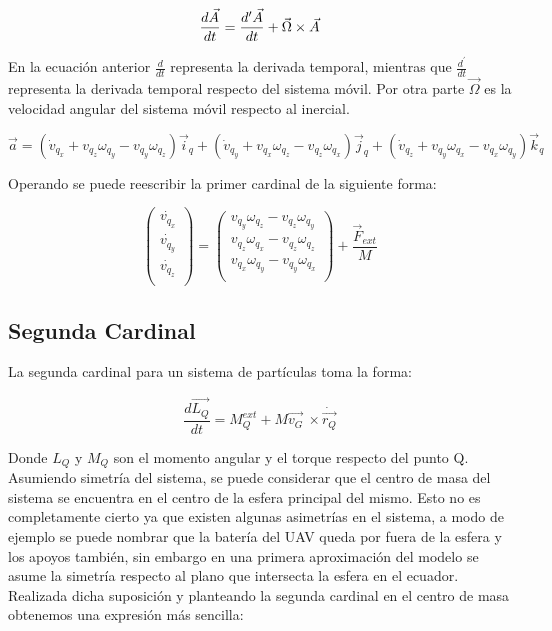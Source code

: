 \documentclass[main]{subfiles}
\begin{document}
\begin{equation}
\frac{d\vec{A}}{dt} =\frac{d^\prime\vec{A}}{dt}+\vec{\Omega}\times\vec{A} \\
\end{equation}

En la ecuaci\'on anterior $\frac{d}{dt}$ representa la derivada temporal, mientras que $\frac{d^\prime}{dt}$ representa la derivada temporal respecto del sistema m\'ovil. Por otra parte $\vec{\Omega}$ es la velocidad angular del sistema m\'ovil respecto al inercial. 

\begin{equation}
\vec{a} = (\dot{v}_{q_x}+v_{q_z} \omega_{q_y} - v_{q_y} \omega_{q_z} )\vec{i}_q + (\dot{v}_{q_y}+v_{q_x} \omega_{q_z} - v_{q_z} \omega_{q_x} )\vec{j}_q+(\dot{v}_{q_z}+v_{q_y} \omega_{q_x} - v_{q_x} \omega_{q_y} )\vec{k}_q
\end{equation}


Operando se puede reescribir la primer cardinal de la siguiente forma:

\begin{equation}
\left(\begin{array}{c}\dot{v_{q_x}}\\
\dot{v_{q_y}}\\
\dot{v_{q_z}}\\
\end{array} \right) = \left(\begin{array}{c}
v_{q_y} \omega_{q_z} - v_{q_z} \omega_{q_y}	\\
v_{q_z} \omega_{q_x} - v_{q_z} \omega_{q_z}\\
v_{q_x} \omega_{q_y} - v_{q_y} \omega_{q_x}\\
\end{array}\right) + \frac{\vec{F}_{ext} }{M}
\label{vpuntos}
\end{equation}


\subsection{Segunda Cardinal}

La segunda cardinal para un sistema de part\'iculas toma la forma:

\begin{equation}
\frac{d\vec{L_Q}}{dt} =M_Q^{ext}+M\vec{v_G}\ \times \dot{\vec{r_Q}} 
\end{equation}

Donde $L_Q$ y $M_Q$ son el momento angular y el torque respecto del punto Q.
Asumiendo simetr\'ia del sistema, se puede considerar que el centro de masa del sistema se encuentra en el centro de la esfera principal del mismo. Esto no es completamente cierto ya que existen algunas asimetr\'ias en el sistema, a modo de ejemplo se puede nombrar que la bater\'ia del UAV queda por fuera de la esfera y los apoyos tambi\'en, sin embargo en una primera aproximaci\'on del modelo se asume la simetr\'ia respecto al plano que intersecta la esfera en el ecuador. Realizada dicha suposici\'on y planteando la segunda cardinal en el centro de masa obtenemos una expresi\'on m\'as sencilla:
\end{document}
